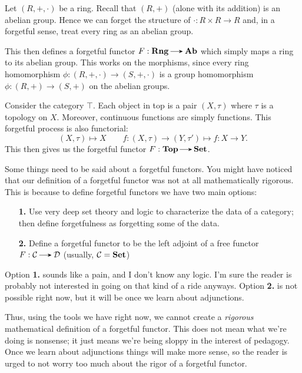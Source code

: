     \begin{example}
        Let $(R, +, \cdot)$ be a ring. Recall that $(R, +)$ (alone with its 
        addition) is an abelian group. Hence we can forget the structure 
        of $\cdot: R\times R \to R$ and, in a forgetful sense, treat every 
        ring as an abelian group.  
        
        This then defines a forgetful functor 
        $F: \textbf{Rng} \to \ab$ which simply maps a ring to
        its abelian group. This works on the morphisms, since every ring homomorphism
        $\phi: (R, +, \cdot) \to (S, +, \cdot)$
        is a group homomorphism $\phi: (R, +) \to (S, +)$ on the abelian groups. 
    \end{example}

    \begin{example}
        Consider the category $\top$.
        Each object in top is a pair $(X, \tau)$ where $\tau$ is a topology on $X$. 
        Moreover, continuous functions are simply functions. This forgetful process is 
        also functorial:
        \[
            (X, \tau) \mapsto X \qquad f: (X, \tau) \to (Y, \tau') \mapsto f: X \to Y.
        \]
        This then gives us the forgetful functor $F: \top \to \Set$.
    \end{example}

    Some things need to be said about a forgetful functors. You might have 
    noticed that our definition of a forgetful functor was not at all mathematically 
    rigorous. This is because to define forgetful functors we have two main options:
    \begin{itemize}
        \item[\textbf{1.}] Use very deep set theory and logic to characterize 
        the data of a category; then define forgetfulness as forgetting some 
        of the data. 
        \item[\textbf{2.}] Define a forgetful functor to be the left adjoint 
        of a free functor $F: \cc \to \dd$ (usually, $\mathcal{C} = \operatorname{\mathbf{Set}}$)   
    \end{itemize}
    Option \textbf{1.} sounds like a pain, and I don't know any logic. I'm sure 
    the reader is probably not interested in going on that kind of a ride anyways. 
    Option \textbf{2.} is not possible right now, but it will be once we learn about 
    adjunctions.

    Thus, using the tools
    we have right now, we cannot create a \emph{rigorous} mathematical definition 
    of a forgetful functor. This does not mean what we're doing is nonsense; it just 
    means we're being sloppy in the interest of pedagogy. Once we learn about adjunctions 
    things will make more sense, so the reader is urged to not worry too much about the 
    rigor of a forgetful functor. 

